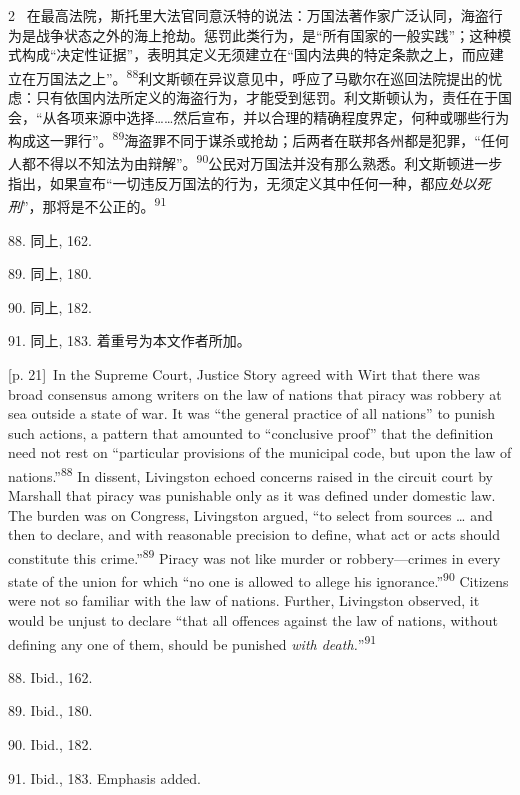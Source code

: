\documentclass[10pt,a4paper]{article}
\begin{document}
\begin{paracol}{2}
\switchcolumn*
{\scriptsize\color{gray} [p. 21]}\ 在最高法院，斯托里大法官同意沃特的说法：万国法著作家广泛认同，海盗行为是战争状态之外的海上抢劫。惩罚此类行为，是“所有国家的一般实践”；这种模式构成“决定性证据”，表明其定义无须建立在“国内法典的特定条款之上，而应建立在万国法之上”。\nobreak\textsuperscript{88}利文斯顿在异议意见中，呼应了马歇尔在巡回法院提出的忧虑：只有依国内法所定义的海盗行为，才能受到惩罚。利文斯顿认为，责任在于国会，“从各项来源中选择……然后宣布，并以合理的精确程度界定，何种或哪些行为构成这一罪行”。\nobreak\textsuperscript{89}海盗罪不同于谋杀或抢劫；后两者在联邦各州都是犯罪，“任何人都不得以不知法为由辩解”。\nobreak\textsuperscript{90}公民对万国法并没有那么熟悉。利文斯顿进一步指出，如果宣布“一切违反万国法的行为，无须定义其中任何一种，都应\textit{处以死刑}”，那将是不公正\mbox{的。\textsuperscript{91}}\par{\small 88. 同上, 162.\par}{\small 89. 同上, 180.\par}{\small 90. 同上, 182.\par}{\small 91. 同上, 183. 着重号为本文作者所加。\par}
\switchcolumn
{\scriptsize\color{gray} [p. 21]}\ In the Supreme Court, Justice Story agreed with Wirt that there was broad consensus among writers on the law of nations that piracy was robbery at sea outside a state of war. It was “the general practice of all nations” to punish such actions, a pattern that amounted to “conclusive proof” that the definition need not rest on “particular provisions of the municipal code, but upon the law of nations.”\nobreak\textsuperscript{88} In dissent, Livingston echoed concerns raised in the circuit court by Marshall that piracy was punishable only as it was defined under domestic law. The burden was on Congress, Livingston argued, “to select from sources … and then to declare, and with reasonable precision to define, what act or acts should constitute this crime.”\nobreak\textsuperscript{89} Piracy was not like murder or robbery—crimes in every state of the union for which “no one is allowed to allege his ignorance.”\nobreak\textsuperscript{90} Citizens were not so familiar with the law of nations. Further, Livingston observed, it would be unjust to declare “that all offences against the law of nations, without defining any one of them, should be punished \textit{with death.}”\nobreak\textsuperscript{91}\par{\small 88. Ibid., 162.\par}{\small 89. Ibid., 180.\par}{\small 90. Ibid., 182.\par}{\small 91. Ibid., 183. Emphasis added.\par}

\end{paracol}
\end{document}
